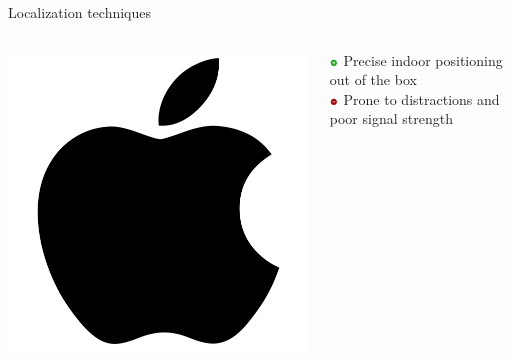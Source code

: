 \documentclass[11pt]{beamer}
\begin{document}
\begin{frame}[t]{Localization techniques}

  \begin{columns}[c]

    \begin{column}{0.17\textwidth}
      \includegraphics[width=\textwidth]{apple}
    \end{column}

    \hfill

\begin{column}{0.8\textwidth}

      \includegraphics[width=0.05\textwidth]{plus} Precise indoor positioning out of the box\\
      \includegraphics[width=0.05\textwidth]{minus} Prone to distractions and poor signal strength

    \end{column}

  \end{columns}


\end{frame}
\end{document}
